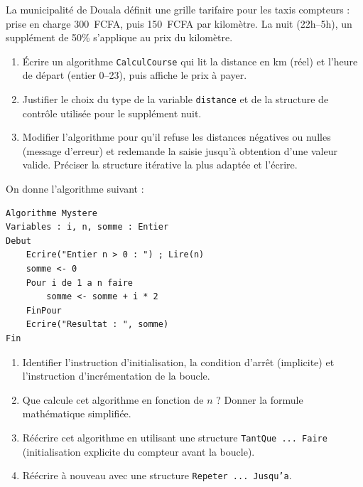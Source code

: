 \documentclass[11pt]{article}
\begin{document}
\begin{exercice}
La municipalité de Douala définit une grille tarifaire pour les taxis compteurs : prise en charge \SI{300}{FCFA}, puis \SI{150}{FCFA} par kilomètre. La nuit (22h--5h), un supplément de 50\% s'applique au prix du kilomètre.
\begin{enumerate}
    \item Écrire un algorithme \texttt{CalculCourse} qui lit la distance en km (réel) et l'heure de départ (entier 0--23), puis affiche le prix à payer.
    \item Justifier le choix du type de la variable \texttt{distance} et de la structure de contrôle utilisée pour le supplément nuit.
    \item Modifier l'algorithme pour qu'il refuse les distances négatives ou nulles (message d'erreur) et redemande la saisie jusqu'à obtention d'une valeur valide. Préciser la structure itérative la plus adaptée et l'écrire.
\end{enumerate}
\end{exercice}

\begin{exercice}
On donne l'algorithme suivant :
\begin{verbatim}
Algorithme Mystere
Variables : i, n, somme : Entier
Debut
    Ecrire("Entier n > 0 : ") ; Lire(n)
    somme <- 0
    Pour i de 1 a n faire
        somme <- somme + i * 2
    FinPour
    Ecrire("Resultat : ", somme)
Fin
\end{verbatim}
\begin{enumerate}
    \item Identifier l'instruction d'initialisation, la condition d'arrêt (implicite) et l'instruction d'incrémentation de la boucle.
    \item Que calcule cet algorithme en fonction de $n$ ? Donner la formule mathématique simplifiée.
    \item Réécrire cet algorithme en utilisant une structure \texttt{TantQue ... Faire} (initialisation explicite du compteur avant la boucle).
    \item Réécrire à nouveau avec une structure \texttt{Repeter ... Jusqu'a}.
\end{enumerate}
\end{exercice}
\end{document}

